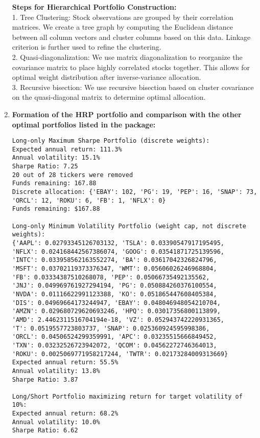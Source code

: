 \documentclass[12pt]{article}
\begin{document}
\begin{enumerate}
\textbf{Steps for Hierarchical Portfolio Construction:}
\\1. Tree Clustering:
Stock observations are grouped by their correlation matrices. We create a tree graph by computing the Euclidean distance between all column vectors and cluster columns based on this data. Linkage criterion is further used to refine the clustering. 
\\2. Quasi-diagonalization: 
We use matrix diagonalization to reorganize the covariance matrix to place highly correlated stocks together. This allows for optimal weight distribution after inverse-variance allocation.
\\3. Recursive bisection:
We use recursive bisection based on cluster covariance on the quasi-diagonal matrix to determine optimal allocation.

\newpage
\item\textbf{Formation of the HRP portfolio and comparison with the other optimal portfolios listed in the package:}
\begin{verbatim}
Long-only Maximum Sharpe Portfolio (discrete weights):
Expected annual return: 111.3%
Annual volatility: 15.1%
Sharpe Ratio: 7.25
20 out of 28 tickers were removed
Funds remaining: 167.88
Discrete allocation: {'EBAY': 102, 'PG': 19, 'PEP': 16, 'SNAP': 73,
'ORCL': 12, 'ROKU': 6, 'FB': 1, 'NFLX': 0}
Funds remaining: $167.88

Long-only Minimum Volatility Portfolio (weight cap, not discrete weights):
{'AAPL': 0.02793345126703132, 'TSLA': 0.03390547917195495,
'NFLX': 0.024168442567386074, 'GOOG': 0.03541871725139596,
'INTC': 0.033958562163552274, 'BA': 0.03617042326824796,
'MSFT': 0.03702119373376347, 'WMT': 0.05606026246968804,
'FB': 0.03334387510268078, 'PEP': 0.05066735492135562, 
'JNJ': 0.049969761927294194, 'PG': 0.050884260376100554,
'NVDA': 0.01116622991123388, 'KO': 0.051865447608405384,
'DIS': 0.04969664173244947, 'EBAY': 0.048046948054210704,
'AMZN': 0.029680729620693246, 'HPQ': 0.03017356800113899,
'AMD': 2.4462311516704194e-18, 'VZ': 0.052943742220931365,
'T': 0.0519557723803737, 'SNAP': 0.025360924595998386,
'ORCL': 0.04506524299359991, 'APC': 0.03235515666849452,
'TXN': 0.03232526723942072, 'QCOM': 0.04562272746364013,
'ROKU': 0.0025069771958217244, 'TWTR': 0.02173284009313669}
Expected annual return: 55.5%
Annual volatility: 13.8%
Sharpe Ratio: 3.87

Long/Short Portfolio maximizing return for target volatility of 10%:
Expected annual return: 68.2%
Annual volatility: 10.0%
Sharpe Ratio: 6.62


\end{verbatim}
\end{enumerate}
\end{document}
